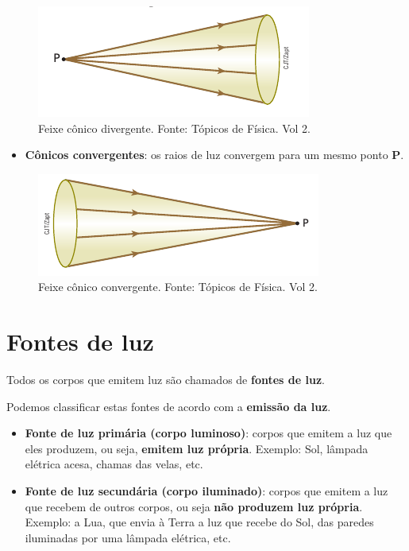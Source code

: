 \documentclass[11pt,twocolumn,oneside]{article}
\begin{document}
\begin{figure}[h]{}
\centering\includegraphics[width=2.5truein]{img1.png}
\caption{Feixe cônico divergente. Fonte: Tópicos de Física. Vol 2.}
\centering
\end{figure}

\begin{itemize}

\item \textbf{Cônicos convergentes}: os raios de luz convergem para um mesmo ponto \textbf{P}.

\end{itemize}


\begin{figure}[h]{}
\centering\includegraphics[width=2.5truein]{img2.png}
\caption{Feixe cônico convergente. Fonte: Tópicos de Física. Vol 2.}
\centering
\end{figure}

\hypertarget{x-fontes-de-luz}{\section{Fontes de luz}}
Todos os corpos que emitem luz são chamados de \textbf{fontes de luz}.


Podemos classificar estas fontes de acordo com a \textbf{emissão da luz}.


\begin{itemize}

\item \textbf{Fonte de luz primária (corpo luminoso)}: corpos que emitem a luz que eles produzem, ou seja, \textbf{emitem luz própria}. Exemplo: Sol, lâmpada elétrica acesa, chamas das velas, etc.

\item \textbf{Fonte de luz secundária (corpo iluminado)}: corpos que emitem a luz que recebem de outros corpos, ou seja \textbf{não produzem luz própria}. Exemplo: a Lua, que envia à Terra a luz que recebe do Sol, das paredes iluminadas por uma lâmpada elétrica, etc.

\end{itemize}
\end{document}
